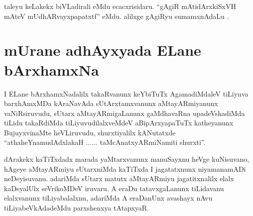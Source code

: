 \begin{artha}
taleyu keLakekx biVLadirali eMdu ecacxrisidaru. ``gAgiR mAtidArxkiSxVH mAteV mUdhARvayxpapatxtf'' eMdu. alilxge gAgiRyu sumamxnAdaLu .
\end{artha}


\section*{mUrane adhAyxyada ELane bArxhamxNa}


\begin{artha}
I ELane bArxhamxNadalilx takaRvanunx keYbiTuTx AgamadiMdaleV tiLiyuva barxhAmxMDa kAraNavAda sUtArxtamxvanunx aMtayARmiyanunx vaNiRsiruvudu, sUtarx aMtayARmigaLanunx gaMdhavaRna upadeVshadiMda tiLidu takaRdiMda tiLiyuvudilalxveMdeV aBipArxyapaTuTx katheyanunx BujuyxvinaMte heVLiruvudu, shurxtiyalilx kANutatxde \mdash  ``athaheYnamudAdxlakaH ...... taMcAnatxyARmiNamiti shurxti''.
\end{artha}


\begin{artha}
dArakekx kaTiTxdadx marada yaMtarxvanunx manuSayxnu heVge kuNisuvano, hAgeye aMtayARmiyu sUtarxniMda kaTiTxda I jagatatxnunx niyamanamADi neDeyisuvanu. adariMda sUtarx matutx aMtayARmiyu jagatitxnalilx elalx kaDeyalUlx seVrikoMDeV iruvaru. A eraDu tatavxgaLanunx tiLidavanu elalxvanunx tiLiyabalalxnu, adariMda A eraDanUnx avashayx nAvu tiLiyabeVkAdadeMdu parxshenxya tAtapxyaR.
\end{artha}


